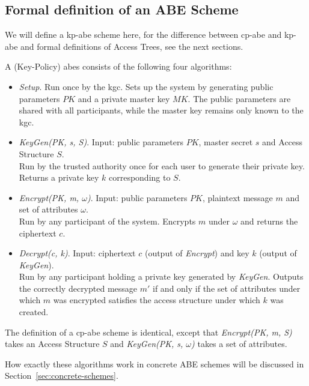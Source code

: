 \subsection{Formal definition of an ABE Scheme}\label{sec:definition-es}

We will define a \acrshort{kp-abe} scheme here, for the difference between \acrshort{cp-abe} and \acrshort{kp-abe} and formal definitions of Access Trees, see the next sections.

\begin{definition}
    A (Key-Policy) \Acrlong{abes} consists of the following four algorithms:~\cite{goyal_attribute-based_2006}
    \begin{itemize}
        \item \emph{Setup}. Run once by the \acrfull{kgc}. Sets up the system by generating public parameters $PK$ and a private master key $MK$. The public parameters are shared with all participants, while the master key remains only known to the \acrshort{kgc}.
        \item \emph{KeyGen(PK, s, S)}. Input: public parameters $PK$, master secret $s$ and Access Structure $S$.\\
        Run by the trusted authority once for each user to generate their private key. Returns a private key $k$ corresponding to $S$.
        \item \emph{Encrypt(PK, m, $\omega$)}. Input: public parameters $PK$, plaintext message $m$ and set of attributes $\omega$.\\
        Run by any participant of the system. Encrypts $m$ under $\omega$ and returns the ciphertext $c$.
        \item \emph{Decrypt(c, k)}. Input: ciphertext $c$ (output of \emph{Encrypt}) and key $k$ (output of \emph{KeyGen}).\\
        Run by any participant holding a private key generated by \emph{KeyGen}. Outputs the correctly decrypted message $m'$ if and only if the set of attributes under which $m$ was encrypted satisfies the access structure under which $k$ was created.
    \end{itemize}
\end{definition}

The definition of a \acrshort{cp-abe} scheme is identical, except that \emph{Encrypt(PK, m, S)} takes an Access Structure $S$ and \emph{KeyGen(PK, s, $\omega$)} takes a set of attributes.

How exactly these algorithms work in concrete ABE schemes will be discussed in Section~\ref{sec:concrete-schemes}.

